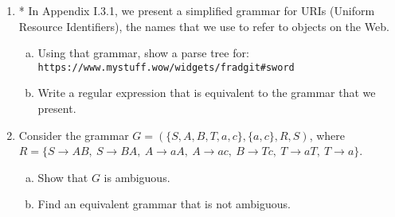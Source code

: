 \documentclass[10pt]{article}
\begin{document}
\begin{enumerate}[1)]
\item
* In Appendix I.3.1, we present a simplified grammar for URIs (Uniform Resource Identifiers), the names that we use to refer to objects on the Web.  
\begin{enumerate}[a)]
\item
Using that grammar, show a parse tree for:\\
\texttt{https://www.mystuff.wow/widgets/fradgit\#sword}
\item
Write a regular expression that is equivalent to the grammar that we present.
\end{enumerate}

\item
Consider the grammar $G = (\{S, A, B, T, a, c\}, \{a, c\}, R, S)$, where $R = \{S \rightarrow AB,\ S \rightarrow BA,\ A \rightarrow aA,\ A \rightarrow ac,\ B \rightarrow Tc,\ T \rightarrow aT,\ T \rightarrow a\}$.
\begin{enumerate}[a)]
\item
Show that $G$ is ambiguous.  
\item
Find an equivalent grammar that is not ambiguous.
\end{enumerate}
\end{enumerate}
\end{document}
